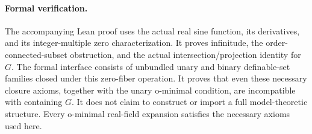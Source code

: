 \documentclass[11pt]{article}
\begin{document}
\paragraph{Formal verification.}
The accompanying Lean proof uses the actual real sine function, its derivatives, and its integer-multiple zero characterization. It proves infinitude, the order-connected-subset obstruction, and the actual intersection/projection identity for $G$. The formal interface consists of unbundled unary and binary definable-set families closed under this zero-fiber operation. It proves that even these necessary closure axioms, together with the unary o-minimal condition, are incompatible with containing $G$. It does not claim to construct or import a full model-theoretic structure. Every o-minimal real-field expansion satisfies the necessary axioms used here.
\end{document}
